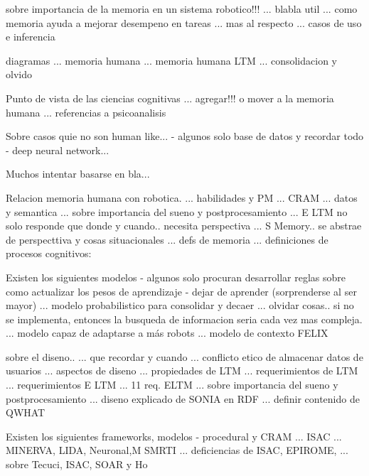 sobre importancia de la memoria en un sistema robotico!!!
... blabla util \cite{Vijayakumar2014}
... como memoria ayuda a mejorar desempeno en tareas \cite{Salgado2012}
... mas al respecto \cite{Ho2009}
... casos de uso e inferencia \cite{Vijayakumar2014}


diagramas
... memoria humana \cite{Vijayakumar2014}
... memoria humana LTM \cite{Stachowicz2012}
... consolidacion y olvido \cite{Deutsch2008}

Punto de vista de las ciencias cognitivas
... agregar!!! o mover a la memoria humana
... referencias a psicoanalisis \cite{Deutsch2008}

Sobre casos quie no son human like...
- algunos solo base de datos y recordar todo
- deep neural network... \cite{KimMinJoo2016}


Muchos intentar basarse en bla...


Relacion memoria humana con robotica.
... habilidades y PM \cite{Salgado2012} ... CRAM
... datos y semantica
... sobre importancia del sueno y postprocesamiento \cite{Kelley2014}
 ... E LTM no solo responde que donde y cuando.. necesita perspectiva \cite{Stachowicz2012}
... S Memory.. se abstrae de perspecttiva y cosas situacionales \cite{Stachowicz2012}
... defs de memoria \cite{Deutsch2008}
... definiciones de procesos cognitivos: \cite{Deutsch2008}
 
 
Existen los siguientes modelos
- algunos solo procuran desarrollar reglas sobre como actualizar los pesos de aprendizaje
- dejar de aprender (sorprenderse al ser mayor)
... modelo probabilistico para consolidar y decaer \cite{Dodd2005}
... olvidar cosas.. si no se implementa, entonces la busqueda de informacion seria cada vez mas compleja. \cite{Deutsch2008}
... modelo capaz de adaptarse a m\'as robots \cite{Ho2009}
... modelo de contexto \cite{Sanchez:2015} FELIX

sobre el diseno..
... que recordar y cuando \cite{Kasap2010}
... conflicto etico de almacenar datos de usuarios \cite{Ho2009}
... aspectos de diseno \cite{Ho2009}
... propiedades de LTM \cite{Jockel2008}
... requerimientos de LTM \cite{Vijayakumar2014}
... requerimientos E LTM \cite{Stachowicz2012}
... 11 req. ELTM \cite{Stachowicz2012}
... sobre importancia del sueno y postprocesamiento \cite{Kelley2014}
... diseno explicado de SONIA en RDF \cite{Vijayakumar2014}
... definir contenido de QWHAT \cite{Stachowicz2012}

Existen los siguientes frameworks, modelos
- procedural y CRAM \cite{Winkler2014}
... ISAC \cite{Dodd2005}
... MINERVA, LIDA, Neuronal,M SMRTI \cite{Jockel2008}
... deficiencias de ISAC, EPIROME, \cite{Stachowicz2012}
... sobre Tecuci, ISAC, SOAR y Ho \cite{Deutsch2008}

